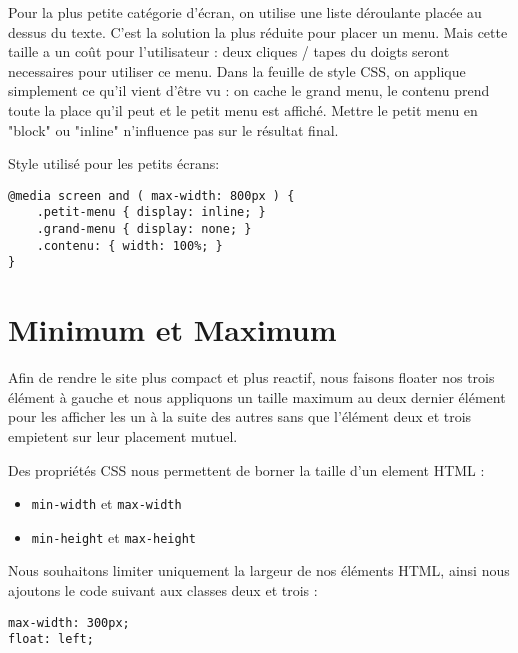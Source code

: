 Pour la plus petite catégorie d'écran, on utilise une liste déroulante placée au dessus du texte. C'est la solution la plus réduite pour placer un menu. Mais cette taille a un coût pour l'utilisateur : deux cliques / tapes du doigts seront necessaires pour utiliser ce menu.  Dans la feuille de style CSS, on applique simplement ce qu'il vient d'être vu : on cache le grand menu, le contenu prend toute la place qu'il peut et le petit menu est affiché. Mettre le petit menu en "block" ou "inline" n'influence pas sur le résultat final.

Style utilisé pour les petits écrans:
\begin{verbatim}
@media screen and ( max-width: 800px ) {
	.petit-menu { display: inline; }
	.grand-menu { display: none; }
	.contenu: { width: 100%; }
}
\end{verbatim}

\section{Minimum et Maximum}
Afin de rendre le site plus compact et plus reactif, nous faisons floater nos trois élément à gauche et nous appliquons un taille maximum au deux dernier élément pour les afficher les un à la suite des autres sans que l'élément deux et trois empietent sur leur placement mutuel.

Des propriétés CSS nous permettent de borner la taille d'un element HTML :
\begin{itemize}
\item \texttt{min-width} et \texttt{max-width}
\item \texttt{min-height} et \texttt{max-height}
\end{itemize}

Nous souhaitons limiter uniquement la largeur de nos éléments HTML, ainsi nous ajoutons le code suivant aux classes deux et trois :
\begin{verbatim}
max-width: 300px;
float: left;
\end{verbatim}

